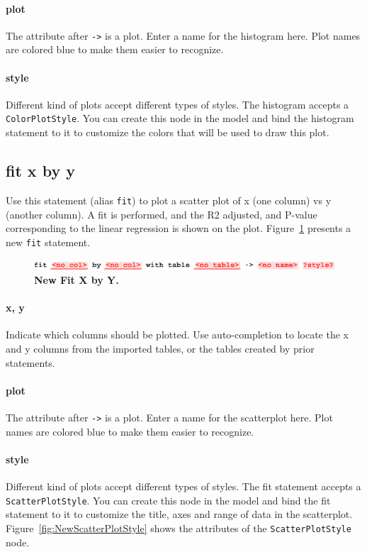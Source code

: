 \paragraph{plot}
The attribute after \texttt{->} is a plot. Enter a name for the histogram here. Plot names are colored blue to make them easier to recognize.

\paragraph{style}
Different kind of plots accept different types of styles. The histogram accepts a \texttt{Color\allowbreak{}Plot\allowbreak{}Style}. You can create this node in the model and bind the histogram statement to it to customize the colors that will be used to draw this plot. 



\subsection{fit x by y}
Use this statement (alias \texttt{fit}) to plot a scatter plot of x (one column) vs y (another column). A fit is performed, and the R2 adjusted, and P-value corresponding to the linear regression is shown on the plot. Figure~\ref{fig:NewFitXByY} presents a new \texttt{fit} statement.

\begin{figure}[h!tbp]
  \centering
  \includegraphics[width=\figWidthWide]{figures/NewFitXByY.pdf}
\caption[New Fit X by Y.]{\textbf{New Fit X by Y.}}
\label{fig:NewFitXByY}
\end{figure}

\paragraph{x, y}
Indicate which columns should be plotted. Use auto-completion to locate the x and y columns from the imported tables, or the tables created by prior statements. 

\paragraph{plot}
The attribute after \texttt{->} is a plot. Enter a name for the scatterplot here. Plot names are colored blue to make them easier to recognize.

\paragraph{style}
Different kind of plots accept different types of styles. The fit statement accepts a \texttt{Scatter\allowbreak{}Plot\allowbreak{}Style}. You can create this node in the model and bind the fit statement to it to customize the title, axes and range of data in the scatterplot. Figure~\ref{fig:NewScatterPlotStyle} shows the attributes of the \texttt{ScatterPlotStyle} node.

